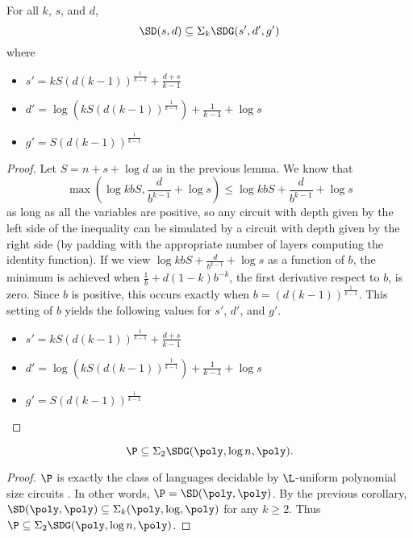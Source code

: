 \documentclass{article}
\begin{document}
\begin{corollary}
  For all $k$, $s$, and $d$,
  \begin{equation*}
    \SD(s, d) \subseteq \Sigma_k \SDG(s', d', g') %
  \end{equation*}
  where
  \begin{itemize}
  \item $s' = k S (d (k - 1))^{\frac{1}{k - 1}} + \frac{d + s}{k - 1}$
  \item $d' = \log\left(k S (d (k - 1))^{\frac{1}{k - 1}}\right) + \frac{1}{k - 1} + \log s$
  \item $g' = S (d (k - 1))^{\frac{1}{k - 1}}$
  \end{itemize}
\end{corollary}
\begin{proof}
  Let $S = n + s + \log d$ as in the previous lemma.
  We know that
  \begin{equation*}
    \max(\log k b S, \frac{d}{b^{k - 1}} + \log s) \leq \log k b S + \frac{d}{b^{k - 1}} + \log s
  \end{equation*}
  as long as all the variables are positive, so any circuit with depth given by the left side of the inequality can be simulated by a circuit with depth given by the right side (by padding with the appropriate number of layers computing the identity function).
  If we view $\log k b S + \frac{d}{b^{k - 1}} + \log s$ as a function of $b$, the minimum is achieved when $\frac{1}{b} + d (1 - k) b^{-k}$, the first derivative respect to $b$, is zero.
  Since $b$ is positive, this occurs exactly when $b = (d (k - 1))^{\frac{1}{k - 1}}$.
  This setting of $b$ yields the following values for $s'$, $d'$, and $g'$.
  \begin{itemize}
  \item $s' = k S (d (k - 1))^{\frac{1}{k - 1}} + \frac{d + s}{k - 1}$
  \item $d' = \log\left(k S (d (k - 1))^{\frac{1}{k - 1}}\right) + \frac{1}{k - 1} + \log s$
  \item $g' = S (d (k - 1))^{\frac{1}{k - 1}}$ \qedhere
  \end{itemize}
\end{proof}

\begin{corollary}
  \begin{equation*}
    \P \subseteq \Sigma_2 \SDG(\poly, \log n, \poly).
  \end{equation*}
\end{corollary}
\begin{proof}
  $\P$ is exactly the class of languages decidable by $\L$-uniform polynomial size circuits \autocite[Theorem~6.15]{ab09}.
  In other words, $\P = \SD(\poly, \poly)$.
  By the previous corollary, $\SD(\poly, \poly) \subseteq \Sigma_k (\poly, \log, \poly)$ for any $k \geq 2$.
  Thus $\P \subseteq \Sigma_2 \SDG(\poly, \log n, \poly)$.
\end{proof}
\end{document}
